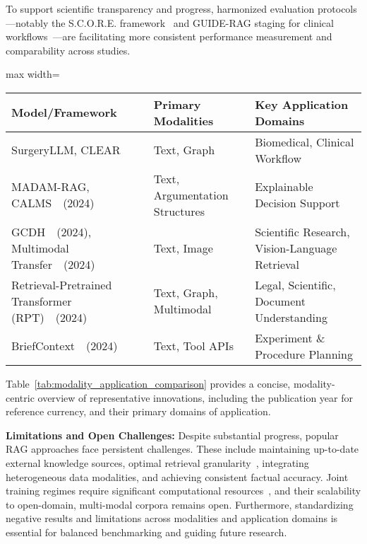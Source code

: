 \documentclass[sigconf]{acmart}
\begin{document}
To support scientific transparency and progress, harmonized evaluation protocols---notably the S.C.O.R.E. framework~\cite{ref8} and GUIDE-RAG staging for clinical workflows~\cite{ref5}---are facilitating more consistent performance measurement and comparability across studies.

\begin{table*}[htbp]
\centering
\caption{Representative Innovations in Knowledge-Augmented AI: Modalities and Applications (Citations include publication year for reference currency)}
\label{tab:modality_application_comparison}
\begin{adjustbox}{max width=\textwidth}
\begin{tabular}{lll}
\toprule
\textbf{Model/Framework}        & \textbf{Primary Modalities}                   & \textbf{Key Application Domains}                 \\
\midrule
SurgeryLLM, CLEAR               & Text, Graph                                   & Biomedical, Clinical Workflow                   \\
MADAM-RAG, CALMS~\cite{ref30}\ (2024) & Text, Argumentation Structures                & Explainable Decision Support                    \\
GCDH~\cite{ref20}\ (2024), Multimodal Transfer~\cite{ref38}\ (2024) & Text, Image                                   & Scientific Research, Vision-Language Retrieval  \\
Retrieval-Pretrained Transformer (RPT)~\cite{ref14}\ (2024) & Text, Graph, Multimodal                         & Legal, Scientific, Document Understanding       \\
BriefContext~\cite{ref48}\ (2024)                    & Text, Tool APIs                               & Experiment \& Procedure Planning                \\
\bottomrule
\end{tabular}
\end{adjustbox}
\end{table*}

Table~\ref{tab:modality_application_comparison} provides a concise, modality-centric overview of representative innovations, including the publication year for reference currency, and their primary domains of application.

\textbf{Limitations and Open Challenges:} Despite substantial progress, popular RAG approaches face persistent challenges. These include maintaining up-to-date external knowledge sources, optimal retrieval granularity~\cite{ref15}, integrating heterogeneous data modalities, and achieving consistent factual accuracy. Joint training regimes require significant computational resources~\cite{ref14}, and their scalability to open-domain, multi-modal corpora remains open. Furthermore, standardizing negative results and limitations across modalities and application domains is essential for balanced benchmarking and guiding future research.
\end{document}
